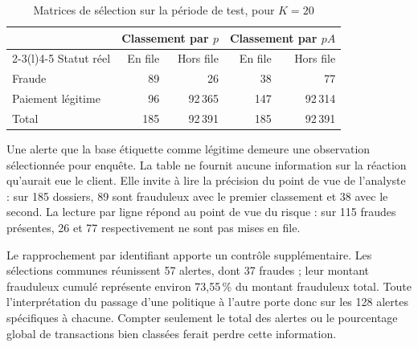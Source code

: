 \documentclass[11pt,a4paper]{article}
\begin{document}
\begin{table}[htbp]\centering
\caption{Matrices de sélection sur la période de test, pour $K=20$}\label{tab:matrices}
\begin{tabular}{@{}lrrrr@{}}\toprule
&\multicolumn{2}{c}{Classement par $p$}&\multicolumn{2}{c}{Classement par $pA$}\\
\cmidrule(lr){2-3}\cmidrule(l){4-5}
Statut réel & En file & Hors file & En file & Hors file\\
\midrule
Fraude & 89 & 26 & 38 & 77\\
Paiement légitime & 96 & 92\,365 & 147 & 92\,314\\
\midrule
Total & 185 & 92\,391 & 185 & 92\,391\\\bottomrule
\end{tabular}
\end{table}

Une alerte que la base étiquette comme légitime demeure une observation sélectionnée pour enquête. La table ne fournit aucune information sur la réaction qu'aurait eue le client. Elle invite à lire la précision du point de vue de l'analyste : sur 185 dossiers, 89 sont frauduleux avec le premier classement et 38 avec le second. La lecture par ligne répond au point de vue du risque : sur 115 fraudes présentes, 26 et 77 respectivement ne sont pas mises en file.

Le rapprochement par identifiant apporte un contrôle supplémentaire. Les sélections communes réunissent 57 alertes, dont 37 fraudes ; leur montant frauduleux cumulé représente environ 73,55\,\% du montant frauduleux total. Toute l'interprétation du passage d'une politique à l'autre porte donc sur les 128 alertes spécifiques à chacune. Compter seulement le total des alertes ou le pourcentage global de transactions bien classées ferait perdre cette information.
\end{document}
